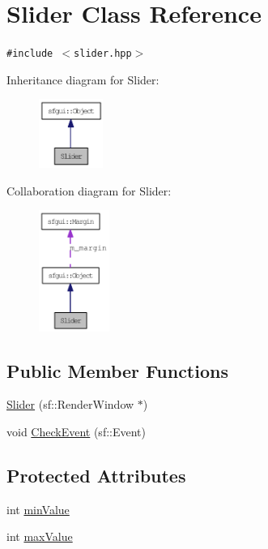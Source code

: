 \hypertarget{classSlider}{
\section{Slider Class Reference}
\label{classSlider}
}
{\tt \#include $<$slider.hpp$>$}

Inheritance diagram for Slider:\nopagebreak
\begin{figure}[H]
\begin{center}
\leavevmode
\includegraphics[width=59pt]{classSlider__inherit__graph}
\end{center}
\end{figure}
Collaboration diagram for Slider:\nopagebreak
\begin{figure}[H]
\begin{center}
\leavevmode
\includegraphics[width=65pt]{classSlider__coll__graph}
\end{center}
\end{figure}
\subsection*{Public Member Functions}
\begin{CompactItemize}
\item 
\hyperlink{classSlider_bb8697044794bd8fad17eb15e07f1498}{Slider} (sf::RenderWindow $\ast$)
\item 
void \hyperlink{classSlider_29b1b660a47bd4c2e2baaedf02a072c3}{CheckEvent} (sf::Event)
\end{CompactItemize}
\subsection*{Protected Attributes}
\begin{CompactItemize}
\item 
int \hyperlink{classSlider_8fe0e11428ca737232d6b71208345c3f}{minValue}
\item 
int \hyperlink{classSlider_20045e1a9ab03ad6f36df2f07deffd39}{maxValue}
\end{CompactItemize}


